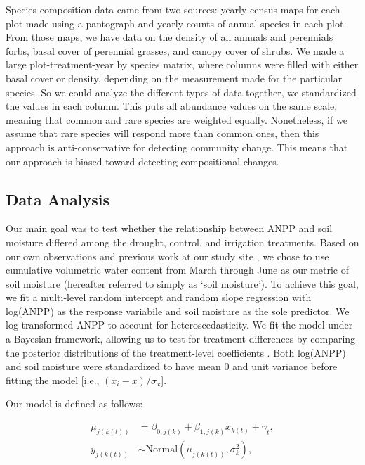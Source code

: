 \documentclass[fleqn,10pt,lineno]{wlpeerj} %
\begin{document}
Species composition data came from two sources: yearly census maps for
each plot made using a pantograph \citep{Hill1920} and yearly counts of
annual species in each plot. From those maps, we have data on the
density of all annuals and perennials forbs, basal cover of perennial
grasses, and canopy cover of shrubs. We made a large plot-treatment-year
by species matrix, where columns were filled with either basal cover or
density, depending on the measurement made for the particular species.
So we could analyze the different types of data together, we
standardized the values in each column. This puts all abundance values
on the same scale, meaning that common and rare species are weighted
equally. Nonetheless, if we assume that rare species will respond more
than common ones, then this approach is anti-conservative for detecting
community change. This means that our approach is biased toward
detecting compositional changes.

\subsection{Data Analysis}\label{data-analysis}

Our main goal was to test whether the relationship between ANPP and soil
moisture differed among the drought, control, and irrigation treatments.
Based on our own observations and previous work at our study site
\citep{Blaisdell1958, Dalgleish2011, Adler2012}, we chose to use
cumulative volumetric water content from March through June as our
metric of soil moisture (hereafter referred to simply as `soil
moisture'). To achieve this goal, we fit a multi-level random intercept
and random slope regression with log(ANPP) as the response variabile and
soil moisture as the sole predictor. We log-transformed ANPP to account
for heteroscedasticity. We fit the model under a Bayesian framework,
allowing us to test for treatment differences by comparing the posterior
distributions of the treatment-level coefficients
\citep[e.g.,][]{Tredennick2013}. Both log(ANPP) and soil moisture were
standardized to have mean 0 and unit variance before fitting the model
{[}i.e., \((x_i - \bar{x})/\sigma_x\){]}.

Our model is defined as follows:

\vspace{-2em}

\begin{align}
\mu_{j(k(t))} &= \beta_{0,j(k)} + \beta_{1,j(k)}x_{k(t)} + \gamma_t, \\
y_{j(k(t))} &\sim \text{Normal} \left(\mu_{j(k(t))}, \sigma^2_{k} \right),
\end{align}
\end{document}
